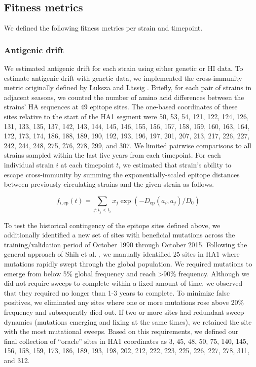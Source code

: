 \subsection*{Fitness metrics}

We defined the following fitness metrics per strain and timepoint.

\subsubsection*{Antigenic drift}

We estimated antigenic drift for each strain using either genetic or HI data.
To estimate antigenic drift with genetic data, we implemented the cross-immunity metric originally defined by {\L}uksza and L\"assig \cite{Luksza:2014hj}.
Briefly, for each pair of strains in adjacent seasons, we counted the number of amino acid differences between the strains' HA sequences at 49 epitope sites.
The one-based coordinates of these sites relative to the start of the HA1 segment were 50, 53, 54, 121, 122, 124, 126, 131, 133, 135, 137, 142, 143, 144, 145, 146, 155, 156, 157, 158, 159, 160, 163, 164, 172, 173, 174, 186, 188, 189, 190, 192, 193, 196, 197, 201, 207, 213, 217, 226, 227, 242, 244, 248, 275, 276, 278, 299, and 307.
We limited pairwise comparisons to all strains sampled within the last five years from each timepoint.
For each individual strain $i$ at each timepoint $t$, we estimated that strain's ability to escape cross-immunity by summing the exponentially-scaled epitope distances between previously circulating strains and the given strain as follows.

\begin{equation}
    f_{i,\mathrm{ep}}(t) = \sum_{j: t_{j} < t_{i}}{x_{j}\exp{(-D_{\mathrm{ep}}(a_{i}, a_{j}) / D_{0})}}
    \label{equation_epitope_cross_immunity}
\end{equation}

To test the historical contingency of the epitope sites defined above, we additionally identified a new set of sites with beneficial mutations across the training/validation period of October 1990 through October 2015.
Following the general approach of Shih et al. \cite{Shih:2007bd}, we manually identified 25 sites in HA1 where mutations rapidly swept through the global population.
We required mutations to emerge from below 5\% global frequency and reach >90\% frequency.
Although we did not require sweeps to complete within a fixed amount of time, we observed that they required no longer than 1-3 years to complete.
To minimize false positives, we eliminated any sites where one or more mutations rose above 20\% frequency and subsequently died out.
If two or more sites had redundant sweep dynamics (mutations emerging and fixing at the same times), we retained the site with the most mutational sweeps.
Based on this requirements, we defined our final collection of ``oracle'' sites in HA1 coordinates as 3, 45, 48, 50, 75, 140, 145, 156, 158, 159, 173, 186, 189, 193, 198, 202, 212, 222, 223, 225, 226, 227, 278, 311, and 312.

